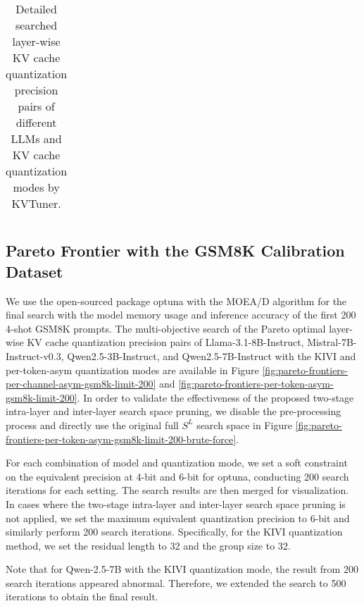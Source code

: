 \begin{table}[h!]
{\begin{tabular}{p{1.7in} p{1.3in} p{0.7in} p{0.8in} p{3.5in}}
\end{tabular}
}
\caption{Detailed searched layer-wise KV cache quantization precision pairs of different LLMs and KV cache quantization modes by KVTuner.}
\label{tab:detailed_config}
\end{table}

\subsection{Pareto Frontier with the GSM8K Calibration Dataset}
We use the open-sourced package optuna \cite{akiba2019optuna} with the MOEA/D algorithm \cite{zhang2007moea} for the final search with the model memory usage and inference accuracy of the first 200 4-shot GSM8K prompts. The multi-objective search of the Pareto optimal layer-wise KV cache quantization precision pairs of Llama-3.1-8B-Instruct, Mistral-7B-Instruct-v0.3, Qwen2.5-3B-Instruct, and Qwen2.5-7B-Instruct with the KIVI and per-token-asym quantization modes are available in Figure \ref{fig:pareto-frontiers-per-channel-asym-gsm8k-limit-200} and \ref{fig:pareto-frontiers-per-token-asym-gsm8k-limit-200}. In order to validate the effectiveness of the proposed two-stage intra-layer and inter-layer search space pruning, we disable the pre-processing process and directly use the original full $S^L$ search space in Figure \ref{fig:pareto-frontiers-per-token-asym-gsm8k-limit-200-brute-force}.

For each combination of model and quantization mode, we set a soft constraint on the equivalent precision at 4-bit and 6-bit for optuna, conducting 200 search iterations for each setting. The search results are then merged for visualization. In cases where the two-stage intra-layer and inter-layer search space pruning is not applied, we set the maximum equivalent quantization precision to 6-bit and similarly perform 200 search iterations. Specifically, for the KIVI quantization method, we set the residual length to 32 and the group size to 32.

Note that for Qwen-2.5-7B with the KIVI quantization mode, the result from 200 search iterations appeared abnormal. Therefore, we extended the search to 500 iterations to obtain the final result.

